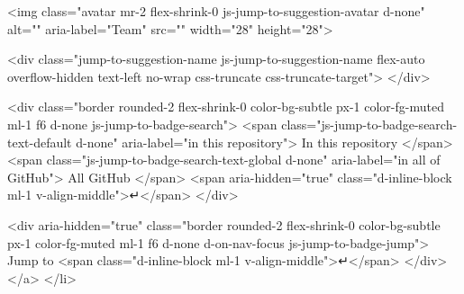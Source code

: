     <img class="avatar mr-2 flex-shrink-0 js-jump-to-suggestion-avatar d-none" alt="" aria-label="Team" src="" width="28" height="28">

    <div class="jump-to-suggestion-name js-jump-to-suggestion-name flex-auto overflow-hidden text-left no-wrap css-truncate css-truncate-target">
    </div>

    <div class="border rounded-2 flex-shrink-0 color-bg-subtle px-1 color-fg-muted ml-1 f6 d-none js-jump-to-badge-search">
      <span class="js-jump-to-badge-search-text-default d-none" aria-label="in this repository">
        In this repository
      </span>
      <span class="js-jump-to-badge-search-text-global d-none" aria-label="in all of GitHub">
        All GitHub
      </span>
      <span aria-hidden="true" class="d-inline-block ml-1 v-align-middle">↵</span>
    </div>

    <div aria-hidden="true" class="border rounded-2 flex-shrink-0 color-bg-subtle px-1 color-fg-muted ml-1 f6 d-none d-on-nav-focus js-jump-to-badge-jump">
      Jump to
      <span class="d-inline-block ml-1 v-align-middle">↵</span>
    </div>
  </a>
</li>

  

